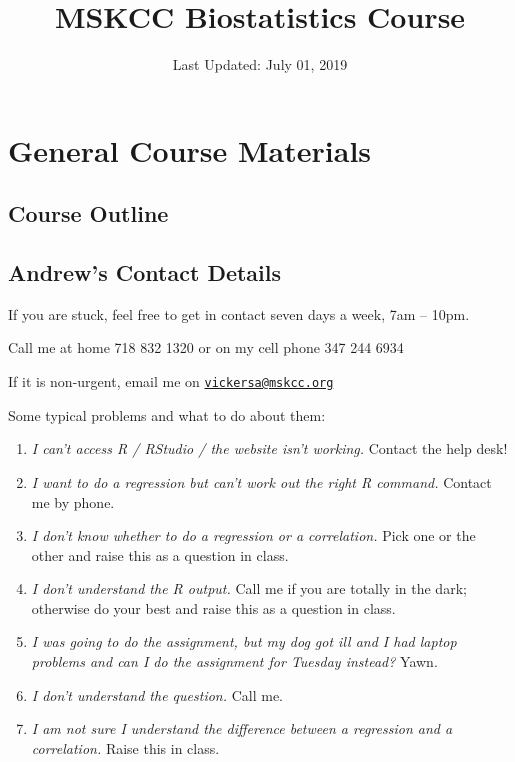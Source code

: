 \documentclass[]{book}
\title{MSKCC Biostatistics Course}
\author{}
\date{Last Updated: July 01, 2019}
\providecommand{\tightlist}{%
  \setlength{\itemsep}{0pt}\setlength{\parskip}{0pt}}
\begin{document}
\maketitle

{
\setcounter{tocdepth}{1}
\tableofcontents
}
\hypertarget{general-course-materials}{%
\chapter*{General Course Materials}\label{general-course-materials}}

\hypertarget{course-outline}{%
\section*{Course Outline}\label{course-outline}}

\hypertarget{andrews-contact-details}{%
\section*{Andrew's Contact Details}\label{andrews-contact-details}}

If you are stuck, feel free to get in contact seven days a week, 7am -- 10pm.

Call me at home 718 832 1320 or on my cell phone 347 244 6934

If it is non-urgent, email me on \href{mailto:vickersa@mskcc.org}{\nolinkurl{vickersa@mskcc.org}}

Some typical problems and what to do about them:

\begin{enumerate}
\def\labelenumi{\arabic{enumi}.}
\tightlist
\item
  \emph{I can't access R / RStudio / the website isn't working.} Contact the help desk!
\item
  \emph{I want to do a regression but can't work out the right R command.} Contact me by phone.
\item
  \emph{I don't know whether to do a regression or a correlation.} Pick one or the other and raise this as a question in class.
\item
  \emph{I don't understand the R output.} Call me if you are totally in the dark; otherwise do your best and raise this as a question in class.
\item
  \emph{I was going to do the assignment, but my dog got ill and I had laptop problems and can I do the assignment for Tuesday instead?} Yawn.
\item
  \emph{I don't understand the question.} Call me.
\item
  \emph{I am not sure I understand the difference between a regression and a correlation.} Raise this in class.
\end{enumerate}
\end{document}
